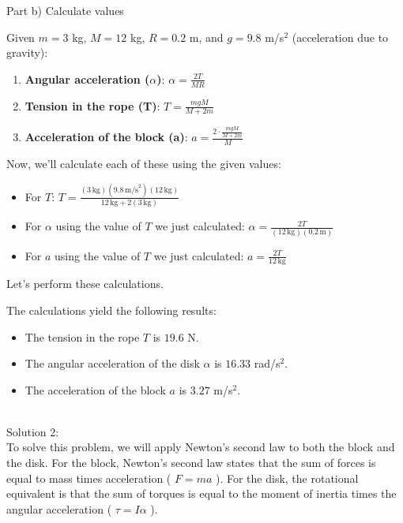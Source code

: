 \documentclass[a4paper,11pt]{article}
\begin{document}
Part b) Calculate values

Given \( m = 3 \) kg, \( M = 12 \) kg, \( R = 0.2 \) m, and \( g = 9.8 \) m/s\(^2\) (acceleration due to gravity):

\begin{enumerate}
    \item \textbf{Angular acceleration (\( \alpha \))}:
       \( \alpha = \frac{2T}{M R} \)
    \item \textbf{Tension in the rope (T)}:
       \( T = \frac{mgM}{M + 2m} \)
    \item \textbf{Acceleration of the block (a)}:
       \( a = \frac{2 \cdot \frac{mgM}{M + 2m}}{M} \)
\end{enumerate}

Now, we'll calculate each of these using the given values:

\begin{itemize}
    \item For \( T \):
      \( T = \frac{(3 \, \text{kg})(9.8 \, \text{m/s}^2)(12 \, \text{kg})}{12 \, \text{kg} + 2(3 \, \text{kg})} \)

    \item For \( \alpha \) using the value of \( T \) we just calculated:
      \( \alpha = \frac{2T}{(12 \, \text{kg})(0.2 \, \text{m})} \)

    \item For \( a \) using the value of \( T \) we just calculated:
      \( a = \frac{2T}{12 \, \text{kg}} \)
\end{itemize}

Let's perform these calculations.

The calculations yield the following results:

\begin{itemize}
    \item The tension in the rope \( T \) is \( 19.6 \) N.
    \item The angular acceleration of the disk \( \alpha \) is \( 16.33 \) rad/s\(^2\).
    \item The acceleration of the block \( a \) is \( 3.27 \) m/s\(^2\).
\end{itemize} \\

\noindent Solution 2: \\ 

To solve this problem, we will apply Newton's second law to both the block and the disk. For the block, Newton's second law states that the sum of forces is equal to mass times acceleration ( \( F = ma \) ). For the disk, the rotational equivalent is that the sum of torques is equal to the moment of inertia times the angular acceleration ( \( \tau = I\alpha \) ).
\end{document}
